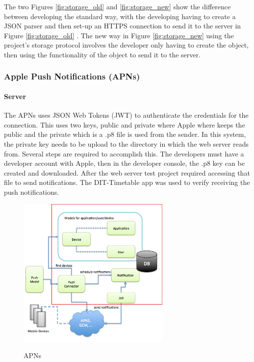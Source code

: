 The two Figures \ref{fig:storage_old} and \ref{fig:storage_new} show the difference between developing the standard way, with the developing having to create a JSON parser and then set-up an HTTPS connection to send it to the server in Figure \ref{fig:storage_old} . The new way in Figure \ref{fig:storage_new} using the project’s storage protocol involves the developer only having to create the object, then using the functionality of the object to send it to the server.

\subsubsection{Apple Push Notifications (APNs)}

\paragraph{Server}
The APNs uses JSON Web Tokens (JWT) to authenticate the credentials for the connection. This uses two keys, public and private where Apple where keeps the public and the private which is a .p8 file is used from the sender. In this system, the private key needs to be upload to the directory in which the web server reads from.  Several steps are required to accomplish this. The developers must have a developer account with Apple, then in the developer console, the .p8 key can be created and downloaded. After the web server test project required accessing that file to send notifications. The DIT-Timetable app was used to verify receiving the push notifications.

\begin{figure}[!h]
    \caption{APNs \cite{apns}}
    \centering
    \includegraphics[width=75mm]{images/APNs}
    \label{fig:apns_overview}
\end{figure}

